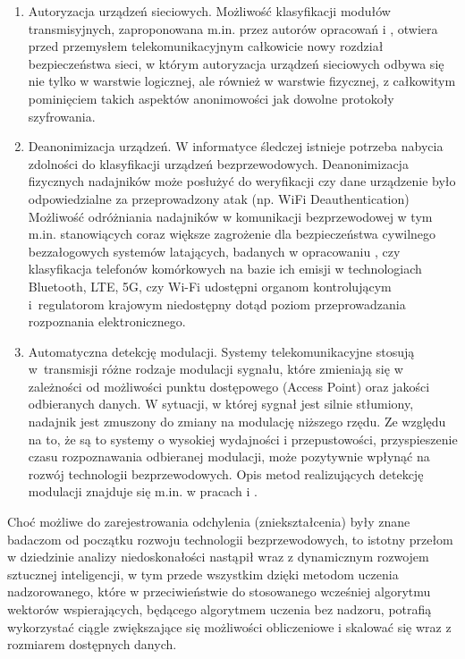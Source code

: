 \begin{enumerate}
    \item Autoryzacja urządzeń sieciowych. Możliwość klasyfikacji modułów transmisyjnych, zaproponowana m.in. przez autorów opracowań \cite{sankhe2019oracle} i \cite{kaur2020rf}, otwiera przed przemysłem telekomunikacyjnym całkowicie nowy rozdział bezpieczeństwa sieci, w którym autoryzacja urządzeń sieciowych odbywa się nie tylko w warstwie logicznej, ale również w warstwie fizycznej, z całkowitym pominięciem takich aspektów anonimowości jak dowolne protokoły szyfrowania.
    \item Deanonimizacja urządzeń. W informatyce śledczej istnieje potrzeba nabycia zdolności do klasyfikacji urządzeń bezprzewodowych. Deanonimizacja fizycznych nadajników może posłużyć do weryfikacji czy dane urządzenie było odpowiedzialne za przeprowadzony atak (np. WiFi Deauthentication) Możliwość odróżniania nadajników w komunikacji bezprzewodowej w tym m.in. stanowiących coraz większe zagrożenie dla bezpieczeństwa cywilnego bezzałogowych systemów latających, badanych w opracowaniu \cite{soltani2021RF}, czy klasyfikacja telefonów komórkowych na bazie ich emisji w technologiach Bluetooth, LTE, 5G, czy Wi-Fi udostępni organom kontrolującym i~regulatorom krajowym niedostępny dotąd poziom przeprowadzania rozpoznania elektronicznego.
    \item Automatyczna detekcję modulacji. Systemy telekomunikacyjne stosują w~transmisji różne rodzaje modulacji sygnału, które zmieniają się w zależności od możliwości punktu dostępowego (Access Point) oraz jakości odbieranych danych. W sytuacji, w której sygnał jest silnie stłumiony, nadajnik jest zmuszony do zmiany na modulację niższego rzędu. Ze względu na to, że są to systemy o wysokiej wydajności i przepustowości, przyspieszenie czasu rozpoznawania odbieranej modulacji, może pozytywnie wpłynąć na rozwój technologii bezprzewodowych. Opis metod realizujących detekcję modulacji znajduje się m.in. w pracach \cite{8362982} i \cite{wang2016distributed}.
\end{enumerate}

Choć możliwe do zarejestrowania odchylenia (zniekształcenia) były znane badaczom od początku rozwoju technologii bezprzewodowych, to istotny przełom w dziedzinie analizy niedoskonałości nastąpił wraz z dynamicznym rozwojem sztucznej inteligencji, w tym przede wszystkim dzięki metodom uczenia nadzorowanego, które w przeciwieństwie do stosowanego wcześniej algorytmu wektorów wspierających, będącego algorytmem uczenia bez nadzoru, potrafią wykorzystać ciągle zwiększające się możliwości obliczeniowe i skalować się wraz z rozmiarem dostępnych danych.

